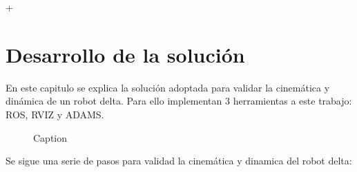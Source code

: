 +\chapter{Desarrollo de la solución}\label{CAP6}
    
    
    En este capitulo se explica la solución adoptada para validar la cinemática y dinámica de un robot delta. Para ello implementan 3 herramientas a este trabajo: ROS, RVIZ y ADAMS. 
    
    \begin{figure}[h]
        \centering
        \caption{Caption}
        \label{fig:cap6_intro_1}
    \end{figure}

    Se sigue una serie de pasos para validad la cinemática y dinamica del robot delta:
    
